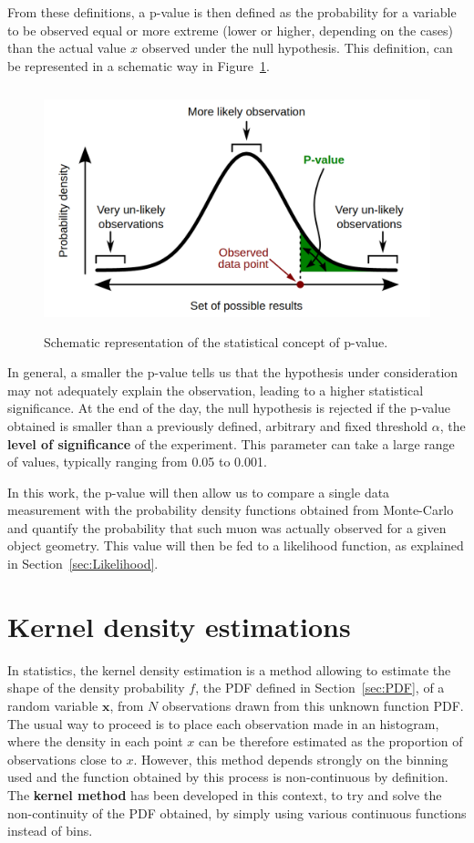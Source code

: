 \documentclass[a4paper, 11pt]{report}
\begin{document}
From these definitions, a p-value is then defined as the probability for a variable to be observed equal or more extreme (lower or higher, depending on the cases) than the actual value $x$ observed under the null hypothesis. This definition, can be represented in a schematic way in Figure~\ref{fig:pvalue}.

\begin{figure}[htbp]
\centering
\includegraphics[width=13cm, height=7cm]{figs/pvalue.png}
\caption{Schematic representation of the statistical concept of p-value.}
\label{fig:pvalue}
\end{figure}

In general, a smaller the p-value tells us that the hypothesis under consideration may not adequately explain the observation, leading to a higher statistical significance. At the end of the day, the null hypothesis is rejected if the p-value obtained is smaller than a previously defined, arbitrary and fixed threshold $\alpha$, the \textbf{level of significance} of the experiment. This parameter can take a large range of values, typically ranging from 0.05 to 0.001.

In this work, the p-value will then allow us to compare a single data measurement with the probability density functions obtained from Monte-Carlo and quantify the probability that such muon was actually observed for a given object geometry. This value will then be fed to a likelihood function, as explained in Section~\ref{sec:Likelihood}.

\section{Kernel density estimations} \label{sec:KDF}

In statistics, the kernel density estimation is a method allowing to estimate the shape of the density probability $f$, the PDF defined in Section~\ref{sec:PDF}, of a random variable $\bm x$, from $N$ observations drawn from this unknown function PDF. The usual way to proceed is to place each observation made in an histogram, where the density in each point $x$ can be therefore estimated as the proportion of observations close to $x$. However, this method depends strongly on the binning used and the function obtained by this process is non-continuous by definition. The \textbf{kernel method} has been developed in this context, to try and solve the non-continuity of the PDF obtained, by simply using various continuous functions instead of bins. 
\end{document}
